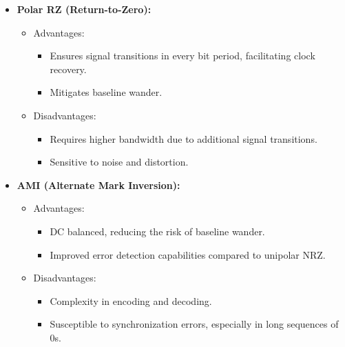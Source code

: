 \documentclass[a4paper, 12pt, english]{article}
\begin{document}
\begin{itemize}
    \item \textbf{Polar RZ (Return-to-Zero):}
        \begin{itemize}
            \item Advantages:
                \begin{itemize}
                    \item Ensures signal transitions in every bit period, facilitating clock recovery.
                    \item Mitigates baseline wander.
                \end{itemize}
            \item Disadvantages:
                \begin{itemize}
                    \item Requires higher bandwidth due to additional signal transitions.
                    \item Sensitive to noise and distortion.
                \end{itemize}
        \end{itemize}
    
    \item \textbf{AMI (Alternate Mark Inversion):}
        \begin{itemize}
            \item Advantages:
                \begin{itemize}
                    \item DC balanced, reducing the risk of baseline wander.
                    \item Improved error detection capabilities compared to unipolar NRZ.
                \end{itemize}
            \item Disadvantages:
                \begin{itemize}
                    \item Complexity in encoding and decoding.
                    \item Susceptible to synchronization errors, especially in long sequences of 0s.
                \end{itemize}
        \end{itemize}
    

\end{itemize}
\end{document}
